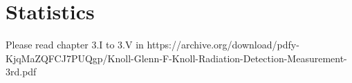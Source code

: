 
\section{Statistics}

Please read chapter 3.I to 3.V in
https://archive.org/download/pdfy-KjqMaZQFCJ7PUQgp/Knoll-Glenn-F-Knoll-Radiation-Detection-Measurement-3rd.pdf





